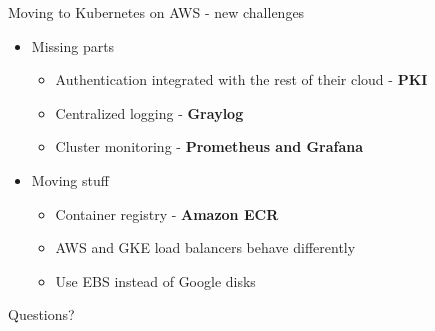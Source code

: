 \documentclass{beamer}
\newcommand{\imageframe}[2]{{
  \usebackgroundtemplate{\texttt{[image: \#1]}}
  \begin{frame}{\vspace{-6pt}\usebeamercolor[fg]{item}\huge{#2}}
  \end{frame}
}}
\begin{document}
  \begin{frame}{Moving to Kubernetes on AWS - new challenges}
  \begin{itemize}
    \item Missing parts
    \begin{itemize}
      \item Authentication integrated with the rest of their cloud - \textbf{PKI}
      \item Centralized logging - \textbf{Graylog}
      \item Cluster monitoring - \textbf{Prometheus and Grafana}
    \end{itemize}
    \item Moving stuff
    \begin{itemize}
      \item Container registry - \textbf{Amazon ECR}
      \item AWS and GKE load balancers behave differently
      \item Use EBS instead of Google disks
    \end{itemize}
  \end{itemize}
  \end{frame}

  \imageframe{images/questions.jpg}{Questions?}
\end{document}
